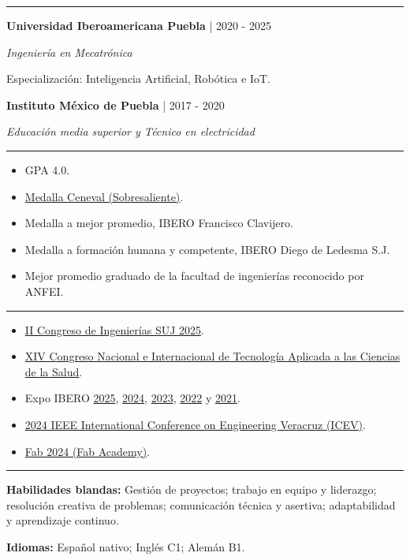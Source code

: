 \documentclass[10pt,letterpaper]{article}
\newcommand{\sectionline}{\vspace{-2pt}\textcolor{accent}{\rule{\linewidth}{0.8pt}}\vspace{1pt}}
\newcommand{\cvsection}[1]{\vspace{5pt}{\large\bfseries\textcolor{navy}{#1}}\par\sectionline}
\newcommand{\entry}[3]{\textbf{#1} \textcolor{muted}{| #2}\par\textit{#3}\par}
\newcommand{\eventlink}[2]{\href{#1}{#2}}
\begin{document}
\cvsection{Educaci\'{o}n}
\entry{Universidad Iberoamericana Puebla}{2020 - 2025}{Ingenier\'{i}a en Mecatr\'{o}nica}
Especializaci\'{o}n: Inteligencia Artificial, Rob\'{o}tica e IoT.

\entry{Instituto M\'{e}xico de Puebla}{2017 - 2020}{Educaci\'{o}n media superior y T\'{e}cnico en electricidad}

\cvsection{Reconocimientos}
\begin{itemize}
  \item GPA 4.0.
  \item \href{https://jphajp.github.io/JPHAJP/Web/assets/docs/cenaval.pdf}{Medalla Ceneval (Sobresaliente)}.
  \item Medalla a mejor promedio, IBERO Francisco Clavijero.
  \item Medalla a formaci\'{o}n humana y competente, IBERO Diego de Ledesma S.J.
  \item Mejor promedio graduado de la facultad de ingenier\'{i}as reconocido por ANFEI.
\end{itemize}

\cvsection{Ponencias destacadas}
\begin{itemize}
  \item \eventlink{https://congresossuj.mx/}{II Congreso de Ingenier\'{i}as SUJ 2025}.
  \item \eventlink{https://www-optica.inaoep.mx/\string~tecnologia_salud/2024/programa.php}{XIV Congreso Nacional e Internacional de Tecnolog\'{i}a Aplicada a las Ciencias de la Salud}.
  \item Expo IBERO \eventlink{https://www.linkedin.com/posts/jphajp_robot-articulado-y-m\%C3\%B3vil-activity-7353272381097869313-Io7Q}{2025}, \eventlink{https://github.com/JPHAJP/Raspberry/tree/main/Interfaces/ProyectoUI}{2024}, \eventlink{https://repositorio.iberopuebla.mx/handle/20.500.11777/5915}{2023}, \eventlink{https://repositorio.iberopuebla.mx/handle/20.500.11777/5221}{2022} y \eventlink{https://www.linkedin.com/posts/jphajp_prototipo-de-regadera-con-temporizador-para-activity-7160025958538743809-kdxj}{2021}.
  \item \eventlink{https://ieeexplore.ieee.org/document/10765997}{2024 IEEE International Conference on Engineering Veracruz (ICEV)}.
  \item \eventlink{https://fabacademy.org/}{Fab 2024 (Fab Academy)}.
\end{itemize}

\cvsection{Habilidades blandas e idiomas}
\textbf{Habilidades blandas:} Gesti\'{o}n de proyectos; trabajo en equipo y liderazgo; resoluci\'{o}n creativa de problemas; comunicaci\'{o}n t\'{e}cnica y asertiva; adaptabilidad y aprendizaje continuo.\par
\textbf{Idiomas:} Espa\~{n}ol nativo; Ingl\'{e}s C1; Alem\'{a}n B1.
\end{document}
